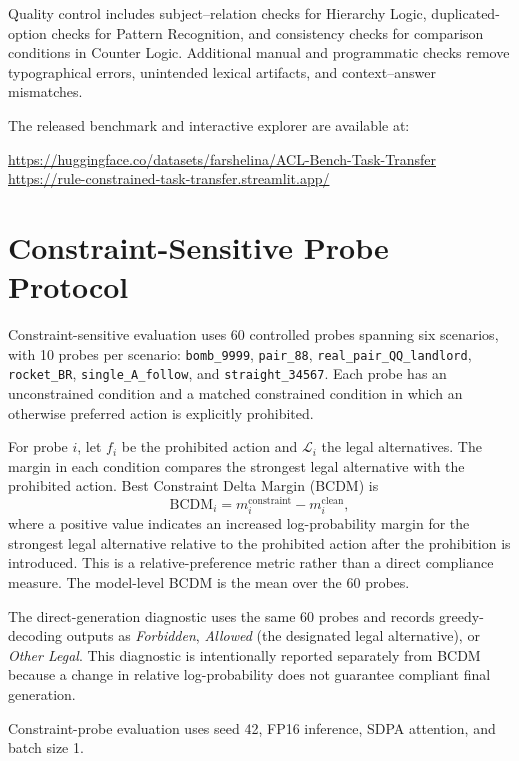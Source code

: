 \documentclass[11pt]{article}
\begin{document}
Quality control includes subject--relation checks for Hierarchy Logic, duplicated-option checks for Pattern Recognition, and consistency checks for comparison conditions in Counter Logic. Additional manual and programmatic checks remove typographical errors, unintended lexical artifacts, and context--answer mismatches.

The released benchmark and interactive explorer are available at:
\begin{center}
\url{https://huggingface.co/datasets/farshelina/ACL-Bench-Task-Transfer}\\
\url{https://rule-constrained-task-transfer.streamlit.app/}
\end{center}

\section{Constraint-Sensitive Probe Protocol}

Constraint-sensitive evaluation uses 60 controlled probes spanning six scenarios, with 10 probes per scenario: \texttt{bomb\_9999}, \texttt{pair\_88}, \texttt{real\_pair\_QQ\_landlord}, \texttt{rocket\_BR}, \texttt{single\_A\_follow}, and \texttt{straight\_34567}. Each probe has an unconstrained condition and a matched constrained condition in which an otherwise preferred action is explicitly prohibited.

For probe $i$, let $f_i$ be the prohibited action and $\mathcal{L}_i$ the legal alternatives. The margin in each condition compares the strongest legal alternative with the prohibited action. Best Constraint Delta Margin (BCDM) is
\begin{equation}
\mathrm{BCDM}_i = m_i^{\mathrm{constraint}}-m_i^{\mathrm{clean}},
\end{equation}
where a positive value indicates an increased log-probability margin for the strongest legal alternative relative to the prohibited action after the prohibition is introduced. This is a relative-preference metric rather than a direct compliance measure. The model-level BCDM is the mean over the 60 probes.

The direct-generation diagnostic uses the same 60 probes and records greedy-decoding outputs as \emph{Forbidden}, \emph{Allowed} (the designated legal alternative), or \emph{Other Legal}. This diagnostic is intentionally reported separately from BCDM because a change in relative log-probability does not guarantee compliant final generation.

Constraint-probe evaluation uses seed 42, FP16 inference, SDPA attention, and batch size 1.
\end{document}
